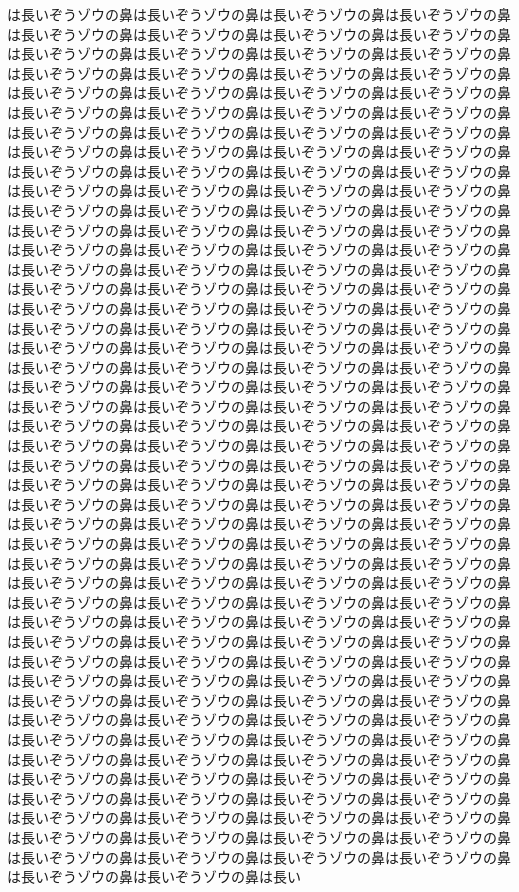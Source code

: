 は長いぞうゾウの鼻は長いぞうゾウの鼻は長いぞうゾウの鼻は長いぞうゾウの鼻は長いぞうゾウの鼻は長いぞうゾウの鼻は長いぞうゾウの鼻は長いぞうゾウの鼻は長いぞうゾウの鼻は長いぞうゾウの鼻は長いぞうゾウの鼻は長いぞうゾウの鼻は長いぞうゾウの鼻は長いぞうゾウの鼻は長いぞうゾウの鼻は長いぞうゾウの鼻は長いぞうゾウの鼻は長いぞうゾウの鼻は長いぞうゾウの鼻は長いぞうゾウの鼻は長いぞうゾウの鼻は長いぞうゾウの鼻は長いぞうゾウの鼻は長いぞうゾウの鼻は長いぞうゾウの鼻は長いぞうゾウの鼻は長いぞうゾウの鼻は長いぞうゾウの鼻は長いぞうゾウの鼻は長いぞうゾウの鼻は長いぞうゾウの鼻は長いぞうゾウの鼻は長いぞうゾウの鼻は長いぞうゾウの鼻は長いぞうゾウの鼻は長いぞうゾウの鼻は長いぞうゾウの鼻は長いぞうゾウの鼻は長いぞうゾウの鼻は長いぞうゾウの鼻は長いぞうゾウの鼻は長いぞうゾウの鼻は長いぞうゾウの鼻は長いぞうゾウの鼻は長いぞうゾウの鼻は長いぞうゾウの鼻は長いぞうゾウの鼻は長いぞうゾウの鼻は長いぞうゾウの鼻は長いぞうゾウの鼻は長いぞうゾウの鼻は長いぞうゾウの鼻は長いぞうゾウの鼻は長いぞうゾウの鼻は長いぞうゾウの鼻は長いぞうゾウの鼻は長いぞうゾウの鼻は長いぞうゾウの鼻は長いぞうゾウの鼻は長いぞうゾウの鼻は長いぞうゾウの鼻は長いぞうゾウの鼻は長いぞうゾウの鼻は長いぞうゾウの鼻は長いぞうゾウの鼻は長いぞうゾウの鼻は長いぞうゾウの鼻は長いぞうゾウの鼻は長いぞうゾウの鼻は長いぞうゾウの鼻は長いぞうゾウの鼻は長いぞうゾウの鼻は長いぞうゾウの鼻は長いぞうゾウの鼻は長いぞうゾウの鼻は長いぞうゾウの鼻は長いぞうゾウの鼻は長いぞうゾウの鼻は長いぞうゾウの鼻は長いぞうゾウの鼻は長いぞうゾウの鼻は長いぞうゾウの鼻は長いぞうゾウの鼻は長いぞうゾウの鼻は長いぞうゾウの鼻は長いぞうゾウの鼻は長いぞうゾウの鼻は長いぞうゾウの鼻は長いぞうゾウの鼻は長いぞうゾウの鼻は長いぞうゾウの鼻は長いぞうゾウの鼻は長いぞうゾウの鼻は長いぞうゾウの鼻は長いぞうゾウの鼻は長いぞうゾウの鼻は長いぞうゾウの鼻は長いぞうゾウの鼻は長いぞうゾウの鼻は長いぞうゾウの鼻は長いぞうゾウの鼻は長いぞうゾウの鼻は長いぞうゾウの鼻は長いぞうゾウの鼻は長いぞうゾウの鼻は長いぞうゾウの鼻は長いぞうゾウの鼻は長いぞうゾウの鼻は長いぞうゾウの鼻は長いぞうゾウの鼻は長いぞうゾウの鼻は長いぞうゾウの鼻は長いぞうゾウの鼻は長いぞうゾウの鼻は長いぞうゾウの鼻は長いぞうゾウの鼻は長いぞうゾウの鼻は長いぞうゾウの鼻は長いぞうゾウの鼻は長いぞうゾウの鼻は長いぞうゾウの鼻は長いぞうゾウの鼻は長いぞうゾウの鼻は長いぞうゾウの鼻は長いぞうゾウの鼻は長いぞうゾウの鼻は長いぞうゾウの鼻は長いぞうゾウの鼻は長いぞうゾウの鼻は長いぞうゾウの鼻は長いぞうゾウの鼻は長いぞうゾウの鼻は長いぞうゾウの鼻は長いぞうゾウの鼻は長いぞうゾウの鼻は長いぞうゾウの鼻は長いぞうゾウの鼻は長いぞうゾウの鼻は長いぞうゾウの鼻は長いぞうゾウの鼻は長いぞうゾウの鼻は長いぞうゾウの鼻は長いぞうゾウの鼻は長いぞうゾウの鼻は長いぞうゾウの鼻は長いぞうゾウの鼻は長いぞうゾウの鼻は長いぞうゾウの鼻は長いぞうゾウの鼻は長いぞうゾウの鼻は長いぞうゾウの鼻は長いぞうゾウの鼻は長いぞうゾウの鼻は長いぞうゾウの鼻は長いぞうゾウの鼻は長いぞうゾウの鼻は長いぞうゾウの鼻は長いぞうゾウの鼻は長いぞうゾウの鼻は長いぞうゾウの鼻は長いぞうゾウの鼻は長いぞうゾウの鼻は長いぞうゾウの鼻は長いぞうゾウの鼻は長いぞうゾウの鼻は長いぞうゾウの鼻は長いぞうゾウの鼻は長いぞうゾウの鼻は長いぞうゾウの鼻は長いぞうゾウの鼻は長いぞうゾウの鼻は長いぞうゾウの鼻は長いぞうゾウの鼻は長いぞうゾウの鼻は長いぞうゾウの鼻は長いぞうゾウの鼻は長いぞうゾウの鼻は長いぞうゾウの鼻は長い